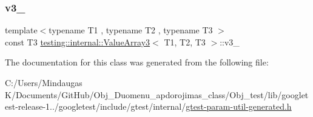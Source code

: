 \subsubsection{\texorpdfstring{v3\_}{v3\_}}
{\footnotesize\ttfamily template$<$typename T1 , typename T2 , typename T3 $>$ \\
const T3 \mbox{\hyperlink{classtesting_1_1internal_1_1_value_array3}{testing\+::internal\+::\+Value\+Array3}}$<$ T1, T2, T3 $>$\+::v3\+\_\+\hspace{0.3cm}{\ttfamily [private]}}



The documentation for this class was generated from the following file\+:\begin{DoxyCompactItemize}
\item 
C\+:/\+Users/\+Mindaugas K/\+Documents/\+Git\+Hub/\+Obj\+\_\+\+Duomenu\+\_\+apdorojimas\+\_\+class/\+Obj\+\_\+test/lib/googletest-\/release-\/1../googletest/include/gtest/internal/\mbox{\hyperlink{gtest-param-util-generated_8h}{gtest-\/param-\/util-\/generated.\+h}}\end{DoxyCompactItemize}
